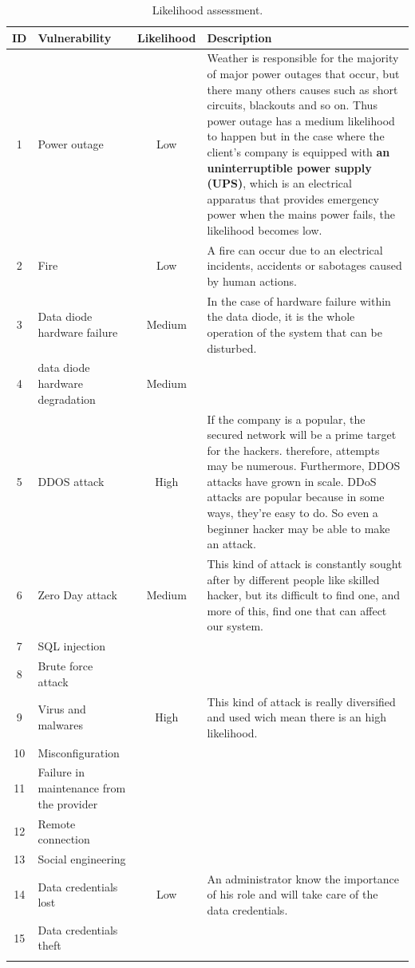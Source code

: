 \documentclass[a4paper,10pt]{article}
\begin{document}
\begin{longtable}{|c|p{}|c|p{10cm}|}
\hline
\textbf{ID}& \textbf{Vulnerability} & \textbf{Likelihood} & \textbf{Description}                 \\
\hline
1 & Power outage & Low & Weather is responsible for the majority of major power outages that occur, but there many others causes such as short circuits, blackouts and so on. Thus power outage has a medium likelihood to happen but in the case where the client's company is equipped with \textbf{an uninterruptible power supply (UPS)}, which is an electrical apparatus that provides emergency power when the mains power fails, the likelihood becomes low.    \\
\hline
2 & Fire & Low  &  A fire can occur due to an electrical incidents, accidents or sabotages caused by human actions.\\
\hline
3 & Data diode hardware failure  & Medium & In the case of hardware failure within the data diode, it is the whole operation of the system that can be disturbed.\\
\hline
4 & data diode hardware degradation & Medium & \\
\hline
5 & DDOS attack & High & If the company is a popular, the secured network will be a prime target for the hackers. therefore, attempts may be numerous. Furthermore, DDOS attacks have grown in scale. DDoS attacks are popular because in some ways, they're easy to do. So even a beginner hacker may be able to make an attack.\\
\hline
6 & Zero Day attack & Medium & This kind of attack is constantly sought after by different people like skilled hacker, but its difficult to find one, and more of this, find one that can affect our system. \\
\hline
7 &  SQL injection &  &   \\
\hline
8 & Brute force attack &  & \\
\hline
9 & Virus and malwares & High & This kind of attack is really diversified and used wich mean there is an high likelihood. \\
\hline
10 & Misconfiguration &  & \\
\hline
11 & Failure in maintenance from the provider &  & \\
\hline
12 & Remote connection &  & \\
\hline
13 & Social engineering  &  & \\
\hline
14 & Data credentials lost & Low & An administrator know the importance of his role and will take care of the data credentials. \\
\hline
15 &  Data credentials theft&  & \\
\hline
\caption{Likelihood assessment.}
\label{tab:likelihood}
\end{longtable}
\end{document}
